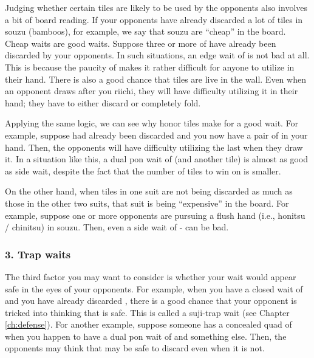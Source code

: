 \bigskip
Judging whether certain tiles are likely to be used by the opponents also involves a bit of board reading. If your opponents have already discarded a lot of tiles in {\jap souzu} (bamboos), for example, we say that {\jap souzu} are ``cheap'' in the board. Cheap waits are good waits. Suppose three or more of {\LARGE{}} have already been discarded by your opponents. In such situations, an edge wait of {\LARGE {}} is not bad at all. This is because the paucity of {\LARGE{}} makes it rather difficult for anyone to utilize {\LARGE{}} in their hand. There is also a good chance that {\LARGE{}} tiles are live in the wall. Even when an opponent draws {\LARGE{}} after you riichi, they will have difficulty utilizing it in their hand; they have to either discard {\LARGE{}} or completely fold.

\bigskip
Applying the same logic, we can see why honor tiles make for a good wait.
For example, suppose {\LARGE\zhong} had already been discarded and you now have a pair of {\LARGE\zhong} in your hand. Then, the opponents will have difficulty utilizing the last {\LARGE\zhong} when they draw it. In a situation like this, a dual {\jap pon} wait of {\LARGE\zhong} (and another tile) is almost as good as side wait, despite the fact that the number of tiles to win on is smaller.

\bigskip
On the other hand, when tiles in one suit are not being discarded as much as those in the other two suits, that suit is being ``expensive'' in the board. For example, suppose one or more opponents are pursuing a flush hand (i.e., {\jap honitsu} / {\jap chinitsu}) in {\jap souzu}. Then, even a side wait of {\LARGE {}-} can be bad.

\subsubsection{3. Trap waits}

The third factor you may want to consider is whether your wait would appear safe in the eyes of your opponents. For example, when you have a closed wait of {\LARGE{}} and you have already discarded {\LARGE{}}, there is a good chance that your opponent is tricked into thinking that {\LARGE{}} is safe. This is called a {\jap suji}-trap wait (see Chapter \ref{ch:defense}). 
For another example, suppose someone has a concealed quad of {\LARGE{}} when you happen to have a dual {\jap pon} wait of {\LARGE{}} and something else. Then, the opponents may think that {\LARGE{}} may be safe to discard even when it is not.

